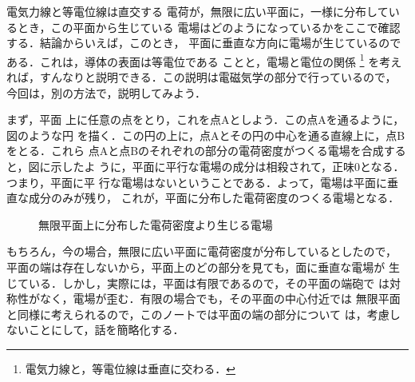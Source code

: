         \begin{memo}{電気力線と等電位線は直交する}
            電荷が，無限に広い平面に，一様に分布しているとき，この平面から生じている
            電場はどのようになっているかをここで確認する．結論からいえば，このとき，
            平面に垂直な方向に電場が生じているのである．これは，導体の表面は等電位である
            ことと，電場と電位の関係
                \footnote{
                    電気力線と，等電位線は垂直に交わる．
                }
            を考えれば，すんなりと説明できる．この説明は電磁気学の部分で行っているので，
            今回は，別の方法で，説明してみよう．

            まず，平面
            上に任意の点をとり，これを点Aとしよう．この点Aを通るように，図のような円
            を描く．この円の上に，点Aとその円の中心を通る直線上に，点Bをとる．これら
            点Aと点Bのそれぞれの部分の電荷密度がつくる電場を合成すると，図に示したよ
            うに，平面に平行な電場の成分は相殺されて，正味0となる．つまり，平面に平
            行な電場はないということである．よって，電場は平面に垂直な成分のみが残り，
            これが，平面に分布した電荷密度のつくる電場となる．
                        \begin{figure}[hbt]
                            \begin{center}
                                \label{fig:capacita_denba}
                                \caption{無限平面上に分布した電荷密度より生じる電場}
                            \end{center}
                        \end{figure}

            もちろん，今の場合，無限に広い平面に電荷密度が分布しているとしたので，
            平面の端は存在しないから，平面上のどの部分を見ても，面に垂直な電場が
            生じている．しかし，実際には，平面は有限であるので，その平面の端砲で
            は対称性がなく，電場が歪む．有限の場合でも，その平面の中心付近では
            無限平面と同様に考えられるので，このノートでは平面の端の部分について
            は，考慮しないことにして，話を簡略化する．
        \end{memo}

